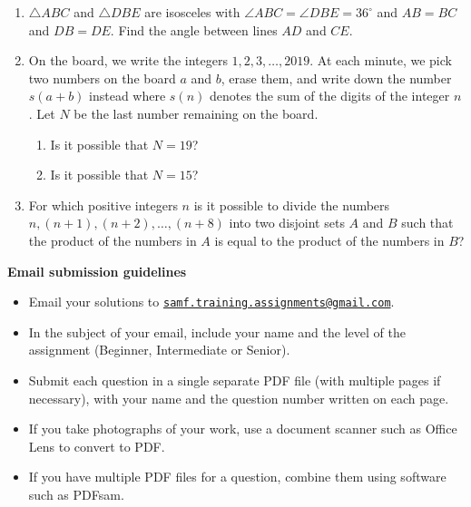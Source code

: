 \documentclass{article}
\begin{document}
\begin{enumerate}[1.]
\vspace{6pt}
\item 
$\triangle ABC$ and $\triangle DBE$ are isosceles with $\angle ABC = \angle DBE = 36^{\circ}$ and $AB = BC$ and $DB = DE$. Find the angle between lines $AD$ and $CE$.

\vspace{6pt}
\item  %
On the board, we write the integers $1, 2, 3, \dots, 2019$. At each minute, we pick two numbers on the board $a$ and $b$, erase them, and write down the number $s(a + b)$ instead where $s(n)$ denotes the sum of the digits of the integer $n$. Let $N$ be the last number remaining on the board.
\begin{enumerate}
	\item Is it possible that $N = 19$?
	\item Is it possible that $N = 15$?
\end{enumerate}

\vspace{6pt}
\item  %
For which positive integers $n$ is it possible to divide the numbers $n, (n + 1), (n + 2), \dots, (n + 8)$ into two disjoint sets $A$ and $B$ such that the product of the numbers in $A$ is equal to the product of the numbers in $B$?

\end{enumerate}


\vspace{4pt}
\textbf{\Large Email submission guidelines}
\begin{itemize}
	\item Email your solutions to \href{mailto:samf.training.assignments@gmail.com}{\texttt{samf.training.assignments@gmail.com}}.
	\item In the subject of your email, include your name and the level of the assignment (Beginner, Intermediate or Senior).
	\item Submit each question in a single separate PDF file (with multiple pages if necessary), with your name and the question number written on each page.
	\item If you take photographs of your work, use a document scanner such as Office Lens to convert to PDF.
	\item If you have multiple PDF files for a question, combine them using software such as PDFsam.
\end{itemize}
\end{document}
